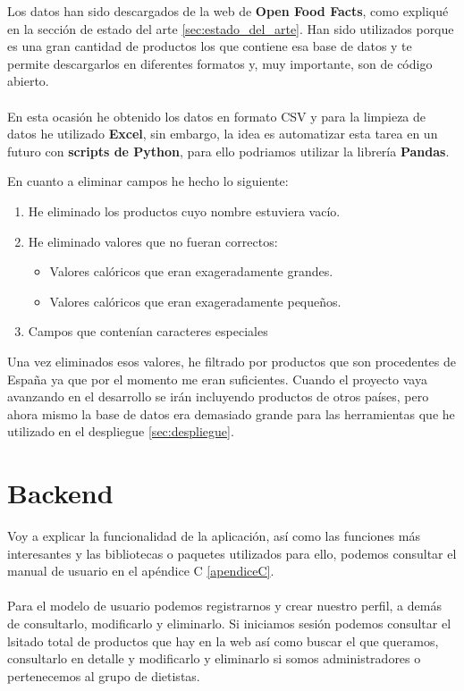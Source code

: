 Los datos han sido descargados de la web de \textbf{Open Food Facts}, como expliqué en la sección de estado del arte \ref{sec:estado_del_arte}.
Han sido utilizados porque es una gran cantidad de productos los que contiene esa base de datos y te permite descargarlos en diferentes formatos y, muy importante,
son de código abierto.\\ \\

En esta ocasión he obtenido los datos en formato CSV y para la limpieza de datos he utilizado \textbf{Excel}, sin embargo, la idea es automatizar esta tarea en un futuro
con \textbf{scripts de Python}, para ello podriamos utilizar la librería \textbf{Pandas}.

En cuanto a eliminar campos he hecho lo siguiente:
\begin{enumerate}
  \item He eliminado los productos cuyo nombre estuviera vacío.
  \item He eliminado valores que no fueran correctos:
  \begin{itemize}
    \item Valores calóricos que eran exageradamente grandes.
    \item Valores calóricos que eran exageradamente pequeños.
  \end{itemize}
  \item Campos que contenían caracteres especiales
\end{enumerate}

Una vez eliminados esos valores, he filtrado por productos que son procedentes de España ya que por el momento me eran suficientes.
Cuando el proyecto vaya avanzando en el desarrollo se irán incluyendo productos de otros países, pero ahora mismo la base de datos era
 demasiado grande para las herramientas que he utilizado en el despliegue \ref{sec:despliegue}.\\

\section{Backend} \label{sec:backend}

Voy a explicar la funcionalidad de la aplicación, así como las funciones más interesantes y las bibliotecas o paquetes utilizados para ello, podemos consultar el manual de usuario en el apéndice C \ref*{apendiceC}. \\ \\

Para el modelo de usuario podemos registrarnos y crear nuestro perfil, a demás de consultarlo, modificarlo y eliminarlo.
Si iniciamos sesión podemos consultar el lsitado total de productos que hay en la web así como buscar el que queramos, consultarlo en detalle y
modificarlo y eliminarlo si somos administradores o pertenecemos al grupo de dietistas.\\ \\

